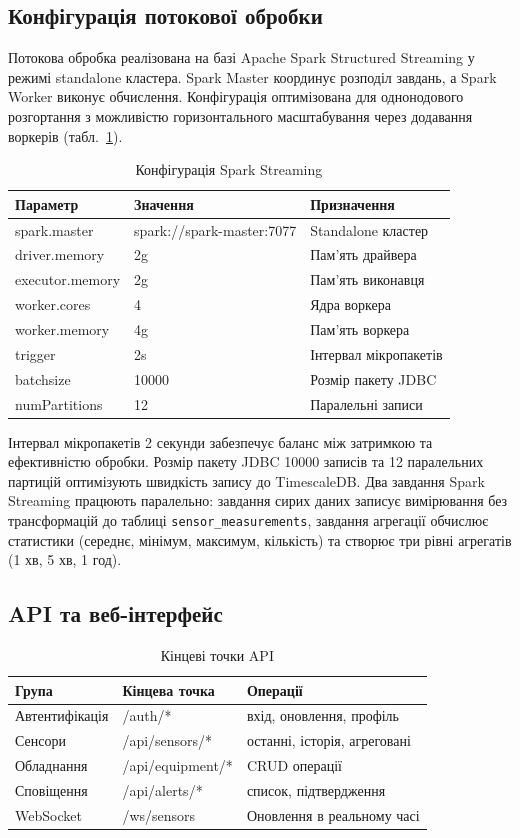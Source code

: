 \subsection{Конфігурація потокової обробки}

Потокова обробка реалізована на базі Apache Spark Structured Streaming у режимі standalone кластера. Spark Master координує розподіл завдань, а Spark Worker виконує обчислення. Конфігурація оптимізована для однонодового розгортання з можливістю горизонтального масштабування через додавання воркерів (табл.~\ref{tab:spark_config}).

\begin{table}[h]
\caption{Конфігурація Spark Streaming}
\label{tab:spark_config}
\begin{tabular}{@{}lll@{}}
\toprule
Параметр & Значення & Призначення \\
\midrule
spark.master & spark://spark-master:7077 & Standalone кластер \\
driver.memory & 2g & Пам'ять драйвера \\
executor.memory & 2g & Пам'ять виконавця \\
worker.cores & 4 & Ядра воркера \\
worker.memory & 4g & Пам'ять воркера \\
trigger & 2s & Інтервал мікропакетів \\
batchsize & 10000 & Розмір пакету JDBC \\
numPartitions & 12 & Паралельні записи \\
\bottomrule
\end{tabular}
\end{table}

Інтервал мікропакетів 2 секунди забезпечує баланс між затримкою та ефективністю обробки. Розмір пакету JDBC 10000 записів та 12 паралельних партицій оптимізують швидкість запису до TimescaleDB. Два завдання Spark Streaming працюють паралельно: завдання сирих даних записує вимірювання без трансформацій до таблиці \texttt{sensor\_measurements}, завдання агрегації обчислює статистики (середнє, мінімум, максимум, кількість) та створює три рівні агрегатів (1 хв, 5 хв, 1 год).

\subsection{API та веб-інтерфейс}

\begin{table}[h]
\caption{Кінцеві точки API}
\label{tab:api_endpoints}
\begin{tabular}{@{}lll@{}}
\toprule
Група & Кінцева точка & Операції \\
\midrule
Автентифікація & /auth/* & вхід, оновлення, профіль \\
Сенсори & /api/sensors/* & останні, історія, агреговані \\
Обладнання & /api/equipment/* & CRUD операції \\
Сповіщення & /api/alerts/* & список, підтвердження \\
WebSocket & /ws/sensors & Оновлення в реальному часі \\
\bottomrule
\end{tabular}
\end{table}

